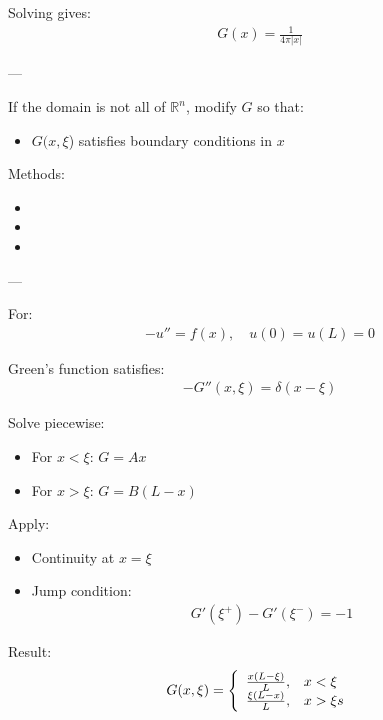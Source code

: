 \documentclass[12pt,a4paper]{report}
\begin{document}
\begin{description}
\begin{description}
\begin{description}
Solving gives:
\begin{align*}
G(x) = \frac{1}{4\pi |x|}
\end{align*}

---

\item {}

If the domain is not all of $\mathbb{R}^n$, modify $G$ so that:

\begin{itemize}
\item $G(x,\xi$) satisfies boundary conditions in $x$
\end{itemize}

Methods:

\begin{itemize}
\item {}
\item {}
\item {}
\end{itemize}

---

\item {}

For:
\begin{align*}
-u'' = f(x), \quad u(0)=u(L)=0
\end{align*}

Green’s function satisfies:
\begin{align*}
-G''(x,\xi) = \delta(x-\xi)
\end{align*}

Solve piecewise:

\begin{itemize}
\item For $x<\xi$: $G = A x$
\item For $x>\xi$: $G = B (L-x)$
\end{itemize}

Apply:

\begin{itemize}
\item Continuity at $x=\xi$
\item Jump condition:
\begin{align*}
  G'( \xi^+) - G'(\xi^-) = -1
\end{align*}
\end{itemize}

Result:
\begin{align*}
G(x,\xi) = \left \{ \begin{array}{ll}  \frac{x(L-\xi)}{L}, & x<\xi \\  \frac{\xi(L-x)}{L}, & x>\xi s \end{array} \right .
\end{align*}


\end{description}
\end{description}
\end{description}
\end{document}
